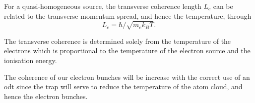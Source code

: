 For a quasi-homogeneous source\cite{nugent_coherent_2009}, the transverse coherence length $L_c$ can be related to the transverse momentum spread, and hence the temperature, through\cite{van_oudheusden_electron_2007}
\begin{equation}
L_c = \hbar/\sqrt{m_e k_B T}.
\end{equation}

The transverse coherence is determined solely from the temperature of the electrons which is proportional to the temperature of the electron source and the ionisation energy.

The coherence of our electron bunches will be increase with the correct use of an \gls{odt} since the trap will serve to reduce the temperature of the atom cloud, and hence the electron bunches.


